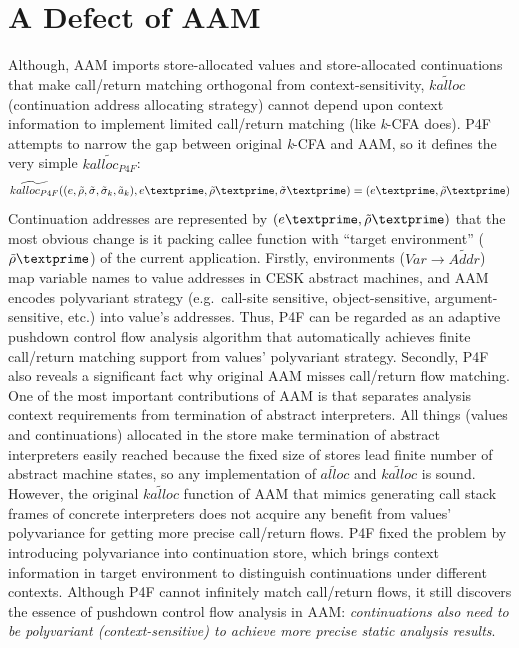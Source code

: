 \documentclass[12pt]{report}
\begin{document}
\section{A Defect of AAM}
\label{sub:Defect}
Although, AAM imports store-allocated values and store-allocated continuations that make call/return matching orthogonal from context-sensitivity, $\widetilde{kalloc}$ (continuation address allocating strategy) cannot depend upon context information to implement limited call/return matching (like \textit{k}-CFA does).
P4F attempts to narrow the gap between original \textit{k}-CFA and AAM, so it defines the very simple $\widetilde{kalloc_{P4F}}$:
\[
\widetilde{kalloc_{P4F}} ((e, \tilde{\rho}, \tilde{\sigma}, \tilde{\sigma}_k, \tilde{a}_k), e\textprime, \tilde{\rho}\textprime, \tilde{\sigma}\textprime) = (e\textprime, \tilde{\rho}\textprime)
\]
Continuation addresses are represented by $(e\textprime, \tilde{\rho}\textprime)$ that the most obvious change is it packing callee function with ``target environment'' ($\tilde{\rho}\textprime$) of the current application.
Firstly, environments ($Var \to \widetilde{Addr}$) map variable names to value addresses in CESK abstract machines, and AAM encodes polyvariant strategy (e.g.\ call-site sensitive, object-sensitive, argument-sensitive, etc.) into value's addresses.
Thus, P4F can be regarded as an adaptive pushdown control flow analysis algorithm that automatically achieves finite call/return matching support from values' polyvariant strategy. %
Secondly, P4F also reveals a significant fact why original AAM misses call/return flow matching.
One of the most important contributions of AAM is that separates analysis context requirements from termination of abstract interpreters.
All things (values and continuations) allocated in the store make termination of abstract interpreters easily reached because the fixed size of stores lead finite number of abstract machine states, so any implementation of $\widetilde{alloc}$ and $\widetilde{kalloc}$ is sound.
However, the original $\widetilde{kalloc}$ function of AAM that mimics generating call stack frames of concrete interpreters does not acquire any benefit from values' polyvariance for getting more precise call/return flows.
P4F fixed the problem by introducing polyvariance into continuation store, which brings context information in target environment to distinguish continuations under different contexts.
Although P4F cannot infinitely match call/return flows, it still discovers the essence of pushdown control flow analysis in AAM\@: \emph{continuations also need to be polyvariant (context-sensitive) to achieve more precise static analysis results}.
\end{document}
